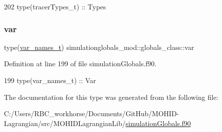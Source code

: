 \begin{DoxyCode}
202         \textcolor{keywordtype}{type}(tracerTypes\_t) :: Types
\end{DoxyCode}
\mbox{\label{structsimulationglobals__mod_1_1globals__class_a752c7c8dc10d072eda09d345a69dca1e}} 
\subsubsection{\texorpdfstring{var}{var}}
{\footnotesize\ttfamily type(\mbox{\hyperlink{structsimulationglobals__mod_1_1var__names__t}{var\+\_\+names\+\_\+t}}) simulationglobals\+\_\+mod\+::globals\+\_\+class\+::var\hspace{0.3cm}{\ttfamily [private]}}



Definition at line 199 of file simulation\+Globals.\+f90.


\begin{DoxyCode}
199         \textcolor{keywordtype}{type}(var\_names\_t)   :: Var
\end{DoxyCode}


The documentation for this type was generated from the following file\+:\begin{DoxyCompactItemize}
\item 
C\+:/\+Users/\+R\+B\+C\+\_\+workhorse/\+Documents/\+Git\+Hub/\+M\+O\+H\+I\+D-\/\+Lagrangian/src/\+M\+O\+H\+I\+D\+Lagrangian\+Lib/\mbox{\hyperlink{simulation_globals_8f90}{simulation\+Globals.\+f90}}\end{DoxyCompactItemize}
